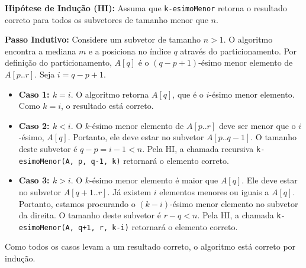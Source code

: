 \documentclass[a4paper,12pt]{article}
\begin{document}
\textbf{Hipótese de Indução (HI):} Assuma que \texttt{k-esimoMenor} retorna o resultado correto para todos os subvetores de tamanho menor que $n$.

\textbf{Passo Indutivo:} Considere um subvetor de tamanho $n > 1$.
O algoritmo encontra a mediana $m$ e a posiciona no índice $q$ através do particionamento. Por definição do particionamento, $A[q]$ é o $(q-p+1)$-ésimo menor elemento de $A[p..r]$. Seja $i = q-p+1$.

\begin{itemize}
    \item \textbf{Caso 1: $k = i$}. O algoritmo retorna $A[q]$, que é o $i$-ésimo menor elemento. Como $k=i$, o resultado está correto.
    \item \textbf{Caso 2: $k < i$}. O $k$-ésimo menor elemento de $A[p..r]$ deve ser menor que o $i$-ésimo, $A[q]$. Portanto, ele deve estar no subvetor $A[p..q-1]$. O tamanho deste subvetor é $q-p = i-1 < n$. Pela HI, a chamada recursiva \texttt{k-esimoMenor(A, p, q-1, k)} retornará o elemento correto.
    \item \textbf{Caso 3: $k > i$}. O $k$-ésimo menor elemento é maior que $A[q]$. Ele deve estar no subvetor $A[q+1..r]$. Já existem $i$ elementos menores ou iguais a $A[q]$. Portanto, estamos procurando o $(k-i)$-ésimo menor elemento no subvetor da direita. O tamanho deste subvetor é $r-q < n$. Pela HI, a chamada \texttt{k-esimoMenor(A, q+1, r, k-i)} retornará o elemento correto.
\end{itemize}
Como todos os casos levam a um resultado correto, o algoritmo está correto por indução.
\newpage
\end{document}
